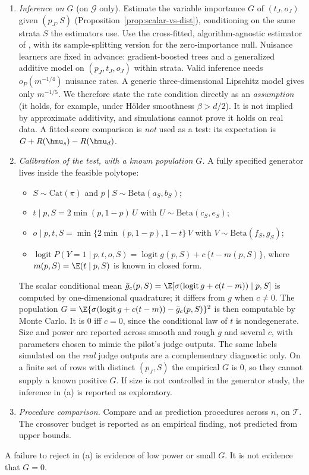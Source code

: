 \begin{enumerate}[label=(\alph*)]
  \item \emph{Inference on $G$} (on $\mathcal G$ only). Estimate the variable importance $G$ of
        $(t_J,o_J)$ given $(p_J,S)$ (Proposition~\ref{prop:scalar-vs-dist}), conditioning on the same
        strata $S$ the estimators use. Use the cross-fitted, algorithm-agnostic estimator of
        \citet{williamson2023general}, with its sample-splitting version for the zero-importance
        null. Nuisance learners are fixed in advance: gradient-boosted trees and a
        generalized additive model on $(p_J,t_J,o_J)$ within strata. Valid inference needs
        $o_P(m^{-1/4})$ nuisance rates. A generic three-dimensional Lipschitz model gives only
        $m^{-1/5}$. We therefore state the rate condition directly as an \emph{assumption} (it holds,
        for example, under H\"older smoothness $\beta>d/2$). It is not implied by approximate
        additivity, and simulations cannot prove it holds on real data. A
        fitted-score comparison is \emph{not} used as a test: its expectation is
        $G+R(\hmu_s)-R(\hmu_d)$.
  \item \emph{Calibration of the test, with a known population $G$.} A fully specified generator
        lives inside the feasible polytope:
        \begin{itemize}
          \item $S\sim\mathrm{Cat}(\pi)$ and $p\mid S\sim\mathrm{Beta}(a_S,b_S)$;
          \item $t\mid p,S=2\min(p,1-p)\,U$ with $U\sim\mathrm{Beta}(c_S,e_S)$;
          \item $o\mid p,t,S=\min\{2\min(p,1-p),1-t\}\,V$ with $V\sim\mathrm{Beta}(f_S,g_S)$;
          \item $\operatorname{logit}P(Y=1\mid p,t,o,S)=\operatorname{logit}g(p,S)+c\,\{t-m(p,S)\}$,
                where $m(p,S)=\E(t\mid p,S)$ is known in closed form.
        \end{itemize}
        The scalar conditional mean $\bar g_c(p,S)=\E[\sigma(\operatorname{logit}g+c(t-m))\mid p,S]$ is
        computed by one-dimensional quadrature; it differs from $g$ when $c\neq0$. The population
        $G=\E\{\sigma(\operatorname{logit}g+c(t-m))-\bar g_c(p,S)\}^2$ is then computable by Monte
        Carlo. It is $0$ iff $c=0$, since the conditional law of $t$ is nondegenerate. Size and
        power are reported across smooth and rough $g$ and several $c$, with parameters chosen to
        mimic the pilot's judge outputs. The same labels simulated on the \emph{real} judge outputs
        are a complementary diagnostic only. On a finite set of rows with distinct $(p_J,S)$ the
        empirical $G$ is $0$, so they cannot supply a known positive $G$. If size is not controlled
        in the generator study, the inference in (a) is reported as exploratory.
  \item \emph{Procedure comparison.} Compare \sfsp{} and \dfsp{} as prediction procedures across $n$,
        on $\mathcal T$. The crossover budget is reported as an empirical finding, not predicted from
        upper bounds.
\end{enumerate}
A failure to reject in (a) is evidence of low power or small $G$. It is not evidence that $G=0$.

